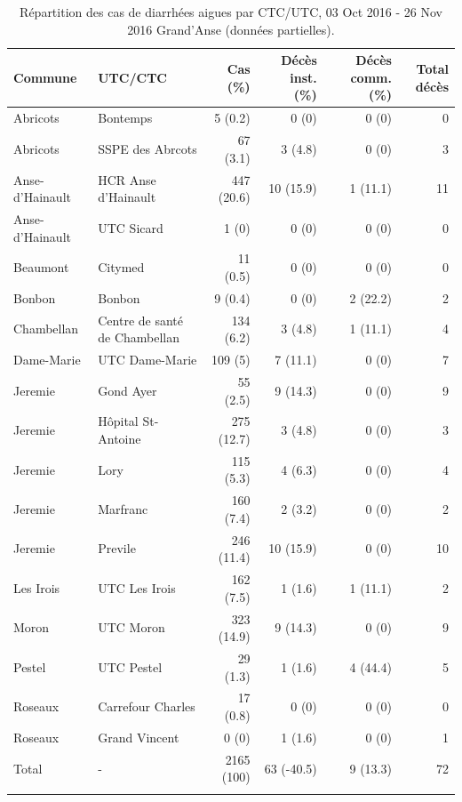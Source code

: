 \documentclass[]{tufte-handout}
\begin{document}
\begin{fullwidth}
\makeatletter\setlength\hsize{\@tufte@fullwidth}\setlength\linewidth{\@tufte@fullwidth}\let\caption\@tufte@orig@caption\makeatother
\footnotesize
\begin{longtable}{llrrrr}
\caption{Répartition des cas de diarrhées aigues par CTC/UTC, 03 Oct 2016 - 26 Nov 2016 Grand’Anse (données partielles).} \\ 
  \toprule
Commune & UTC/CTC & Cas (\%) & Décès inst. (\%) & Décès comm. (\%) & Total décès \\ 
  \midrule
Abricots & Bontemps & 5 (0.2) & 0 (0) & 0 (0) & 0 \\ 
   \rowcolor{whoblue!15}Abricots & SSPE des Abrcots & 67 (3.1) & 3 (4.8) & 0 (0) & 3 \\ 
  Anse-d'Hainault & HCR Anse d'Hainault & 447 (20.6) & 10 (15.9) & 1 (11.1) & 11 \\ 
   \rowcolor{whoblue!15}Anse-d'Hainault & UTC Sicard & 1 (0) & 0 (0) & 0 (0) & 0 \\ 
  Beaumont & Citymed & 11 (0.5) & 0 (0) & 0 (0) & 0 \\ 
   \rowcolor{whoblue!15}Bonbon & Bonbon & 9 (0.4) & 0 (0) & 2 (22.2) & 2 \\ 
  Chambellan & Centre de santé de Chambellan & 134 (6.2) & 3 (4.8) & 1 (11.1) & 4 \\ 
   \rowcolor{whoblue!15}Dame-Marie & UTC Dame-Marie & 109 (5) & 7 (11.1) & 0 (0) & 7 \\ 
  Jeremie & Gond Ayer & 55 (2.5) & 9 (14.3) & 0 (0) & 9 \\ 
   \rowcolor{whoblue!15}Jeremie & Hôpital St-Antoine & 275 (12.7) & 3 (4.8) & 0 (0) & 3 \\ 
  Jeremie & Lory & 115 (5.3) & 4 (6.3) & 0 (0) & 4 \\ 
   \rowcolor{whoblue!15}Jeremie & Marfranc & 160 (7.4) & 2 (3.2) & 0 (0) & 2 \\ 
  Jeremie & Previle & 246 (11.4) & 10 (15.9) & 0 (0) & 10 \\ 
   \rowcolor{whoblue!15}Les Irois & UTC Les Irois & 162 (7.5) & 1 (1.6) & 1 (11.1) & 2 \\ 
  Moron & UTC Moron & 323 (14.9) & 9 (14.3) & 0 (0) & 9 \\ 
   \rowcolor{whoblue!15}Pestel & UTC Pestel & 29 (1.3) & 1 (1.6) & 4 (44.4) & 5 \\ 
  Roseaux & Carrefour Charles & 17 (0.8) & 0 (0) & 0 (0) & 0 \\ 
   \rowcolor{whoblue!15}Roseaux & Grand Vincent & 0 (0) & 1 (1.6) & 0 (0) & 1 \\ 
  Total & - & 2165 (100) & 63 (-40.5) & 9 (13.3) & 72 \\ 
   \bottomrule
\label{tab_overview}
\end{longtable}
\end{fullwidth}
\end{document}
